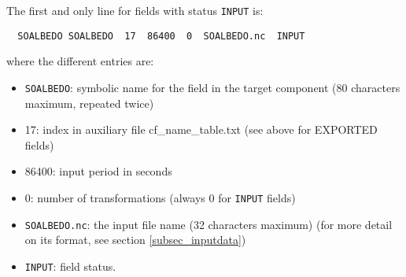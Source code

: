 The first and only line for fields with status {\tt INPUT} is:

  \begin{verbatim}
  SOALBEDO SOALBEDO  17  86400  0  SOALBEDO.nc  INPUT
  \end{verbatim}
\vspace{-0.5cm}
where the different entries are:
\begin{itemize}
\item {\tt SOALBEDO}: symbolic name for the field in the target component
  (80 characters maximum, repeated twice)
\item 17: index in auxiliary file cf\_name\_table.txt (see above for
  EXPORTED fields)
\item 86400: input period in seconds
\item 0: number of transformations (always 0 for {\tt INPUT} fields)
\item {\tt SOALBEDO.nc}:  the input file name (32 characters maximum)
  (for more detail on its format, see section \ref{subsec_inputdata})
\item {\tt INPUT}: field status.
\end{itemize}

